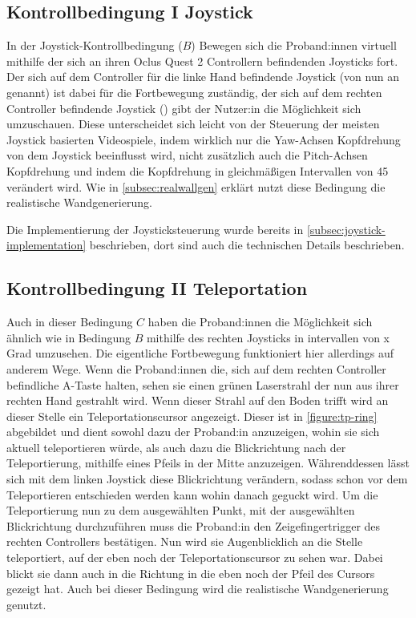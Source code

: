         \subsection{Kontrollbedingung I Joystick}\label{subsec:joystick}
            In der Joystick-Kontrollbedingung ($B$) Bewegen sich die Proband:innen virtuell mithilfe der sich an ihren Oclus Quest 2 Controllern befindenden Joysticks fort. %
            Der sich auf dem Controller für die linke Hand befindende Joystick (von nun an  genannt) ist dabei für die Fortbewegung zuständig, der sich auf dem rechten Controller befindende Joystick () gibt der Nutzer:in die Möglichkeit sich umzuschauen. Diese unterscheidet sich leicht von der Steuerung der meisten Joystick basierten Videospiele, indem wirklich nur die Yaw-Achsen Kopfdrehung von dem Joystick beeinflusst wird, nicht zusätzlich auch die Pitch-Achsen Kopfdrehung und indem die Kopfdrehung in gleichmäßigen Intervallen von
            45 \textdegree
            verändert wird. %
            Wie in \autoref{subsec:realwallgen} erklärt nutzt diese Bedingung die realistische Wandgenerierung.

            Die Implementierung der Joysticksteuerung wurde bereits in \autoref{subsec:joystick-implementation} beschrieben, dort sind auch die technischen Details beschrieben.

        \subsection{Kontrollbedingung II Teleportation}\label{subsec:teleport}
            Auch in dieser Bedingung $C$ haben die Proband:innen die Möglichkeit sich ähnlich wie in Bedingung $B$ mithilfe des rechten Joysticks in intervallen von x Grad%
            umzusehen. Die eigentliche Fortbewegung funktioniert hier allerdings auf anderem Wege. Wenn die Proband:innen die, sich auf dem rechten Controller befindliche
            A-Taste halten, sehen sie einen grünen Laserstrahl der nun aus ihrer rechten Hand gestrahlt wird.
            Wenn dieser Strahl auf den Boden trifft wird an dieser Stelle ein Teleportationscursor angezeigt. Dieser ist in \autoref{figure:tp-ring}
            abgebildet und dient sowohl dazu der Proband:in anzuzeigen, wohin sie sich aktuell teleportieren würde, als auch dazu die Blickrichtung nach der Teleportierung, mithilfe eines Pfeils in der Mitte anzuzeigen. Währenddessen lässt sich mit dem linken Joystick diese Blickrichtung verändern, sodass schon vor dem Teleportieren entschieden werden kann wohin danach geguckt wird. Um die Teleportierung nun zu dem ausgewählten Punkt, mit der ausgewählten Blickrichtung durchzuführen muss die Proband:in den Zeigefingertrigger des rechten Controllers bestätigen.
            Nun wird sie Augenblicklich an die Stelle teleportiert, auf der eben noch der Teleportationscursor zu sehen war. Dabei blickt sie dann auch in die Richtung in die eben noch der Pfeil des Cursors gezeigt hat.
            Auch bei dieser Bedingung wird die realistische Wandgenerierung genutzt.

